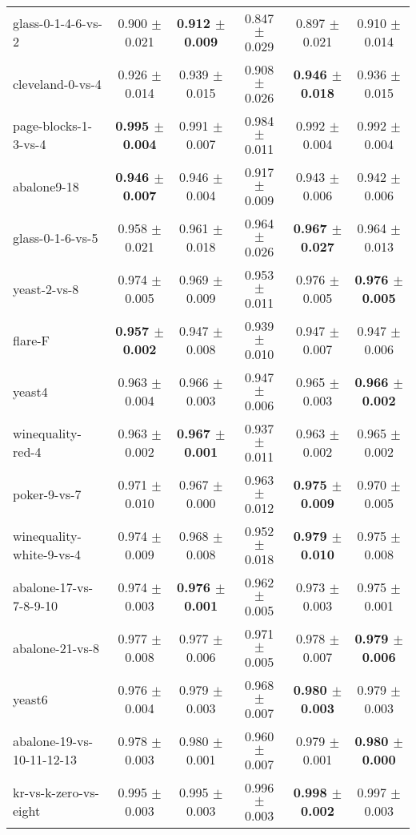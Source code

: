 \begin{table}[!ht]
{\begin{tabular}{l c c c c c}
glass-0-1-4-6-vs-2 & 0.900 $\pm$ 0.021 & \textbf{0.912 $\pm$ 0.009} & 0.847 $\pm$ 0.029 & 0.897 $\pm$ 0.021 & 0.910 $\pm$ 0.014 \\
cleveland-0-vs-4 & 0.926 $\pm$ 0.014 & 0.939 $\pm$ 0.015 & 0.908 $\pm$ 0.026 & \textbf{0.946 $\pm$ 0.018} & 0.936 $\pm$ 0.015 \\
page-blocks-1-3-vs-4 & \textbf{0.995 $\pm$ 0.004} & 0.991 $\pm$ 0.007 & 0.984 $\pm$ 0.011 & 0.992 $\pm$ 0.004 & 0.992 $\pm$ 0.004 \\
abalone9-18 & \textbf{0.946 $\pm$ 0.007} & 0.946 $\pm$ 0.004 & 0.917 $\pm$ 0.009 & 0.943 $\pm$ 0.006 & 0.942 $\pm$ 0.006 \\
glass-0-1-6-vs-5 & 0.958 $\pm$ 0.021 & 0.961 $\pm$ 0.018 & 0.964 $\pm$ 0.026 & \textbf{0.967 $\pm$ 0.027} & 0.964 $\pm$ 0.013 \\
yeast-2-vs-8 & 0.974 $\pm$ 0.005 & 0.969 $\pm$ 0.009 & 0.953 $\pm$ 0.011 & 0.976 $\pm$ 0.005 & \textbf{0.976 $\pm$ 0.005} \\
flare-F & \textbf{0.957 $\pm$ 0.002} & 0.947 $\pm$ 0.008 & 0.939 $\pm$ 0.010 & 0.947 $\pm$ 0.007 & 0.947 $\pm$ 0.006 \\
yeast4 & 0.963 $\pm$ 0.004 & 0.966 $\pm$ 0.003 & 0.947 $\pm$ 0.006 & 0.965 $\pm$ 0.003 & \textbf{0.966 $\pm$ 0.002} \\
winequality-red-4 & 0.963 $\pm$ 0.002 & \textbf{0.967 $\pm$ 0.001} & 0.937 $\pm$ 0.011 & 0.963 $\pm$ 0.002 & 0.965 $\pm$ 0.002 \\
poker-9-vs-7 & 0.971 $\pm$ 0.010 & 0.967 $\pm$ 0.000 & 0.963 $\pm$ 0.012 & \textbf{0.975 $\pm$ 0.009} & 0.970 $\pm$ 0.005 \\
winequality-white-9-vs-4 & 0.974 $\pm$ 0.009 & 0.968 $\pm$ 0.008 & 0.952 $\pm$ 0.018 & \textbf{0.979 $\pm$ 0.010} & 0.975 $\pm$ 0.008 \\
abalone-17-vs-7-8-9-10 & 0.974 $\pm$ 0.003 & \textbf{0.976 $\pm$ 0.001} & 0.962 $\pm$ 0.005 & 0.973 $\pm$ 0.003 & 0.975 $\pm$ 0.001 \\
abalone-21-vs-8 & 0.977 $\pm$ 0.008 & 0.977 $\pm$ 0.006 & 0.971 $\pm$ 0.005 & 0.978 $\pm$ 0.007 & \textbf{0.979 $\pm$ 0.006} \\
yeast6 & 0.976 $\pm$ 0.004 & 0.979 $\pm$ 0.003 & 0.968 $\pm$ 0.007 & \textbf{0.980 $\pm$ 0.003} & 0.979 $\pm$ 0.003 \\
abalone-19-vs-10-11-12-13 & 0.978 $\pm$ 0.003 & 0.980 $\pm$ 0.001 & 0.960 $\pm$ 0.007 & 0.979 $\pm$ 0.001 & \textbf{0.980 $\pm$ 0.000} \\
kr-vs-k-zero-vs-eight & 0.995 $\pm$ 0.003 & 0.995 $\pm$ 0.003 & 0.996 $\pm$ 0.003 & \textbf{0.998 $\pm$ 0.002} & 0.997 $\pm$ 0.003 \\

\end{tabular}}
\end{table}
